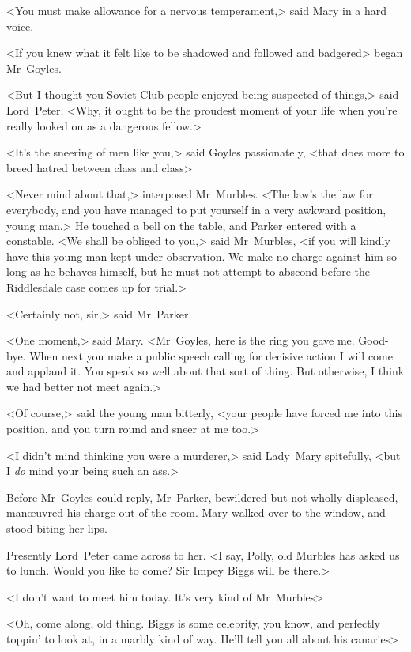 <You must make allowance for a nervous temperament,> said Mary in a hard voice.

<If you knew what it felt like to be shadowed and followed and badgered\longdash> began Mr~Goyles.

<But I thought you Soviet Club people enjoyed being suspected of things,> said Lord~Peter. <Why, it ought to be the proudest moment of your life when you're really looked on as a dangerous fellow.>

<It's the sneering of men like you,> said Goyles passionately, <that does more to breed hatred between class and class\longdash>

<Never mind about that,> interposed Mr~Murbles. <The law's the law for everybody, and you have managed to put yourself in a very awkward position, young man.> He touched a bell on the table, and Parker entered with a constable. <We shall be obliged to you,> said Mr~Murbles, <if you will kindly have this young man kept under observation. We make no charge against him so long as he behaves himself, but he must not attempt to abscond before the Riddlesdale case comes up for trial.>

<Certainly not, sir,> said Mr~Parker.

<One moment,> said Mary. <Mr~Goyles, here is the ring you gave me.  Good-bye. When next you make a public speech calling for decisive action I will come and applaud it. You speak so well about that sort of thing. But otherwise, I think we had better not meet again.>

<Of course,> said the young man bitterly, <your people have forced me into this position, and you turn round and sneer at me too.>

<I didn't mind thinking you were a murderer,> said Lady~Mary spitefully, <but I \emph{do} mind your being such an ass.>

Before Mr~Goyles could reply, Mr~Parker, bewildered but not wholly displeased, manœuvred his charge out of the room. Mary walked over to the window, and stood biting her lips.

Presently Lord~Peter came across to her. <I say, Polly, old Murbles has asked us to lunch. Would you like to come? Sir Impey Biggs will be there.>

<I don't want to meet him today. It's very kind of Mr~Murbles\longdash>

<Oh, come along, old thing. Biggs is some celebrity, you know, and perfectly toppin' to look at, in a marbly kind of way. He'll tell you all about his canaries\longdash>

